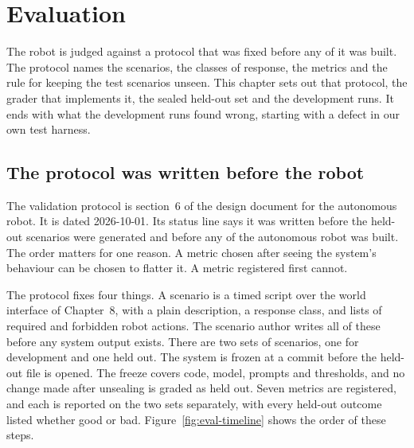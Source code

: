 \chapter{Evaluation}\label{ch:evaluation}

The robot is judged against a protocol that was fixed before any of it was built.
The protocol names the scenarios, the classes of response, the metrics and the rule for keeping
the test scenarios unseen.
This chapter sets out that protocol, the grader that implements it, the sealed held-out set and
the development runs.
It ends with what the development runs found wrong, starting with a defect in our own test
harness.

\section{The protocol was written before the robot}\label{sec:eval-protocol}

The validation protocol is section~6 of the design document for the autonomous robot.
It is dated 2026-10-01.
Its status line says it was written before the held-out scenarios were generated and before any
of the autonomous robot was built.
The order matters for one reason.
A metric chosen after seeing the system's behaviour can be chosen to flatter it.
A metric registered first cannot.

The protocol fixes four things.
A scenario is a timed script over the world interface of Chapter~8, with a plain description,
a response class, and lists of required and forbidden robot actions.
The scenario author writes all of these before any system output exists.
There are two sets of scenarios, one for development and one held out.
The system is frozen at a commit before the held-out file is opened.
The freeze covers code, model, prompts and thresholds, and no change made after unsealing is
graded as held out.
Seven metrics are registered, and each is reported on the two sets separately, with every
held-out outcome listed whether good or bad.
Figure~\ref{fig:eval-timeline} shows the order of these steps.

